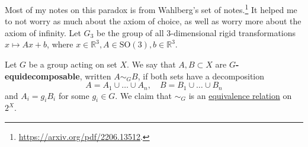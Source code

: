   Most of my notes on this paradox is from Wahlberg's set of notes.\footnote{\href{https://arxiv.org/pdf/2206.13512}{https://arxiv.org/pdf/2206.13512}.} It helped me to not worry as much about the axiom of choice, as well as worry more about the axiom of infinity. Let $G_3$ be the group of all 3-dimensional rigid transformations $x \mapsto Ax + b$, where $x \in \mathbb{R}^3, A \in \mathrm{SO}(3), b \in \mathbb{R}^3$. 

  \begin{definition}[Equidecomposability]
    \label{def:equidecomposability}
    Let $G$ be a group acting on set $X$. We say that $A, B \subset X$ are \textbf{$G$-equidecomposable}, written $A \sim_G B$, if both sets have a decomposition 
    \begin{equation}
      A = A_1 \cup \ldots \cup A_n, \quad B = B_1 \cup \ldots \cup B_n
    \end{equation} 
    and $A_i = g_i B_i$ for some $g_i \in G$. We claim that $\sim_G$ is an \hyperref[def:equivalence_relation]{equivalence relation} on $2^X$. 
  \end{definition}
